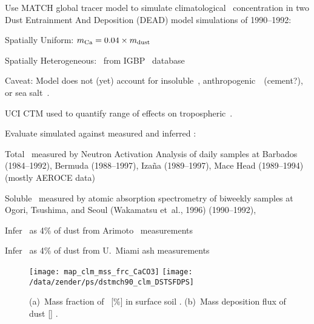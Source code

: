 \documentclass[final,dvips]{foils}
\begin{document}
\rotatefoilhead{\bgl
\Large\textcolor{blue}{\hfill Modeling Strategy \hfill}}\vspace{-0.5in}\large
Use MATCH global tracer model to simulate climatological \CaCOt\
concentration in two Dust Entrainment And Deposition (DEAD) model   
simulations of 1990--1992:
\begin{enumerate*}
\item Spatially Uniform: $\msscncCa = 0.04 \times \msscncdst$
\item Spatially Heterogeneous: \Ca\ from IGBP \CaCOt\ database
  \cite[]{CaS98,Sch99}  
\end{enumerate*}
Caveat: Model does not (yet) account for insoluble~\Ca,
anthropogenic~\Ca\ (cement?), or sea salt~\Ca.
\par
UCI CTM used to quantify range of effects on tropospheric~\Ot.


\rotatefoilhead{\bgl
\Large\textcolor{blue}{\hfill Data Evaluation \hfill}}\vspace{-0.5in}\large
Evaluate simulated against measured and inferred \Ca:
\begin{enumerate*}
\item Total \Ca\ measured by Neutron Activation Analysis
  \cite[]{ADR95,ADS96} of daily samples at Barbados (1984--1992),
  Bermuda (1988--1997),  Iza\~{n}a (1989--1997), Mace Head
  (1989--1994) (mostly AEROCE data)
\item Soluble \Ca\ measured by atomic absorption spectrometry
  of biweekly samples at Ogori, Tsushima, and Seoul (Wakamatsu et~al.,
  1996) (1990--1992),  
\item Infer \Ca\ as 4\% of dust from Arimoto \Al\ measurements
\item Infer \Ca\ as 4\% of dust from U.~Miami ash measurements
\end{enumerate*}

\foilhead{
\Large\textcolor{blue}{\hfill Soil \CaCOt\ Content \hfill}}\vspace{-0.5in}\large
\enlargethispage*{1in} 
\begin{figure}
\centering
\texttt{[image: map\_clm\_mss\_frc\_CaCO3]}\vfill
\texttt{[image: /data/zender/ps/dstmch90\_clm\_DSTSFDPS]}\vfill
\caption{
(a)~Mass fraction of \CaCOt\ [\%] in surface soil \cite[]{Sch99}.
(b)~Mass deposition flux of dust [\ugxmSs] \cite[]{ZBN03}.
\label{fgr:mss_frc_CaCO3}}
\end{figure}
\end{document}
